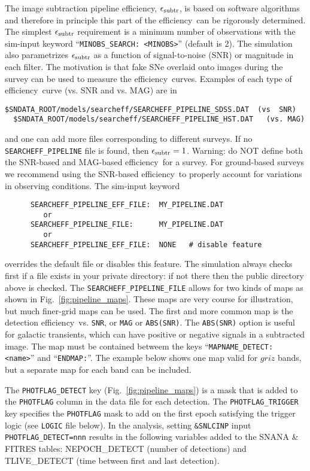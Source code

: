 \documentclass[12pt]{article}
\newcommand{\eff}{efficiency}
\newcommand{\simeffsub}{\epsilon_{\rm subtr}}
\begin{document}
{The image subtraction pipeline \eff, $\simeffsub$,
is based on software algorithms and therefore
in principle this part of the \eff\ can be 
rigorously determined.
The simplest $\simeffsub$ requirement
is a minimum number of observations with
the sim-input keyword ``{\tt MINOBS\_SEARCH: <MINOBS>}''
(default is 2).
The simulation also parametrizes $\simeffsub$ as a function
of signal-to-noise (SNR) or magnitude in each filter.
The motivation is that fake SNe overlaid onto
images during the survey can be used to measure 
the \eff\ curves. Examples of each type of \eff\
curve (vs. SNR and vs. MAG) are in 
%
\begin{Verbatim}[frame=single]
  $SNDATA_ROOT/models/searcheff/SEARCHEFF_PIPELINE_SDSS.DAT  (vs  SNR)
  $SNDATA_ROOT/models/searcheff/SEARCHEFF_PIPELINE_HST.DAT   (vs. MAG)
\end{Verbatim}
and one can add more files corresponding to different surveys.
If no {\tt SEARCHEFF\_PIPELINE} file is found, then $\simeffsub=1$.
Warning: do NOT define both the SNR-based and MAG-based
\eff\ for a survey. For ground-based surveys we recommend
using the SNR-based \eff\ to properly account for variations
in observing conditions. The sim-input keyword
\begin{verbatim}
      SEARCHEFF_PIPELINE_EFF_FILE:  MY_PIPELINE.DAT
         or
      SEARCHEFF_PIPELINE_FILE:      MY_PIPELINE.DAT
         or
      SEARCHEFF_PIPELINE_EFF_FILE:  NONE   # disable feature
\end{verbatim}
%
overrides the default file or disables this feature.
The simulation always checks first if a file exists
in your private directory: if not there then the
public directory above is checked. 
The {\tt SEARCHEFF\_PIPELINE\_FILE} allows for two kinds
of maps as shown in Fig.~\ref{fig:pipeline_maps}.
These maps are very course for illustration, but
much finer-grid maps can be used.
The first and more common map is the detection \eff\
vs. {\tt SNR}, or {\tt MAG} or {\tt ABS(SNR)}.
The {\tt ABS(SNR)} option is useful for galactic transients,
which can have positive or negative signals in a subtracted image.
The map must be contained betweem the keys 
``{\tt MAPNAME\_DETECT: <name>}'' and ``{\tt ENDMAP:}''. 
The example below shows one map valid
for $griz$ bands, but a separate map for each band can be included.

The {\tt PHOTFLAG\_DETECT} key (Fig.~\ref{fig:pipeline_maps})
is a mask that is added to the {\tt PHOTFLAG} column in the data
file for each detection. The {\tt PHOTFLAG\_TRIGGER} key specifies
the {\tt PHOTFLAG} mask to add on the first epoch satisfying
the trigger logic (see {\tt LOGIC} file below).
In the analysis, setting {\tt \&SNLCINP} input 
{\tt PHOTFLAG\_DETECT=nnn} results in the following variables
added to the SNANA \& FITRES tables: 
{NEPOCH\_DETECT} (number of detections) and 
{TLIVE\_DETECT} (time between first and last detection).

}
\end{document}
